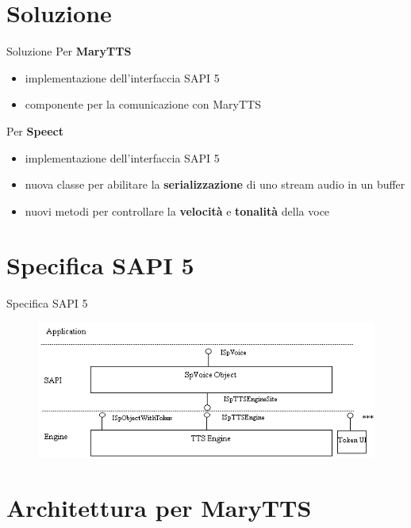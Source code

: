 \documentclass{beamer}
\begin{document}
	\section{Soluzione}
	
	\begin{frame}{Soluzione}
		Per \textbf{MaryTTS}
		\begin{itemize}
			\item implementazione dell'interfaccia SAPI 5
			\item componente per la comunicazione con MaryTTS
		\end{itemize}
		Per \textbf{Speect}
		\begin{itemize}
			\item implementazione dell'interfaccia SAPI 5
			\item nuova classe per abilitare la \textbf{serializzazione} di uno stream audio in un buffer
			\item nuovi metodi per controllare la \textbf{velocità} e \textbf{tonalità} della voce
		\end{itemize}
	\end{frame}

	\section{Specifica SAPI 5}
	
	\begin{frame}{Specifica SAPI 5}
		\begin{figure}[H]
			\centering
			\includegraphics[width=\textwidth]{images/specifica-sapi5}
		\end{figure}
	\end{frame}

	\section{Architettura per MaryTTS}
	
\end{document}
